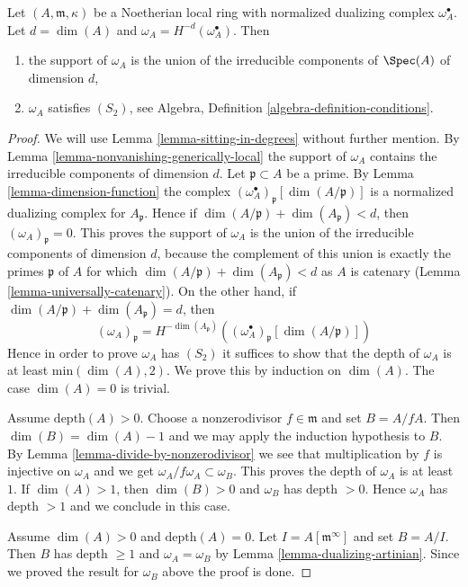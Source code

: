 \begin{lemma}
\label{lemma-depth-dualizing-module}
Let $(A, \mathfrak m, \kappa)$ be a Noetherian local ring with
normalized dualizing complex $\omega_A^\bullet$. Let $d = \dim(A)$
and $\omega_A = H^{-d}(\omega_A^\bullet)$. Then
\begin{enumerate}
\item the support of $\omega_A$ is the union of the irreducible components
of $\Spec(A)$ of dimension $d$,
\item $\omega_A$ satisfies $(S_2)$, see
Algebra, Definition \ref{algebra-definition-conditions}.
\end{enumerate}
\end{lemma}

\begin{proof}
We will use Lemma \ref{lemma-sitting-in-degrees} without further mention.
By Lemma \ref{lemma-nonvanishing-generically-local} the support
of $\omega_A$ contains the irreducible components of dimension $d$.
Let $\mathfrak p \subset A$ be a prime. By Lemma \ref{lemma-dimension-function}
the complex $(\omega_A^\bullet)_{\mathfrak p}[\dim(A/\mathfrak p)]$
is a normalized dualizing complex for $A_\mathfrak p$. Hence if
$\dim(A/\mathfrak p) + \dim(A_\mathfrak p) < d$, then
$(\omega_A)_\mathfrak p = 0$.
This proves the support of $\omega_A$ is the union of the irreducible
components of dimension $d$, because the complement of this union
is exactly the primes $\mathfrak p$ of $A$ for which
$\dim(A/\mathfrak p) + \dim(A_\mathfrak p) < d$ as $A$ is catenary
(Lemma \ref{lemma-universally-catenary}).
On the other hand, if $\dim(A/\mathfrak p) + \dim(A_\mathfrak p) = d$, then
$$
(\omega_A)_\mathfrak p =
H^{-\dim(A_\mathfrak p)}\left(
(\omega_A^\bullet)_{\mathfrak p}[\dim(A/\mathfrak p)] \right)
$$
Hence in order to prove $\omega_A$ has $(S_2)$ it suffices to show that
the depth of $\omega_A$ is at least $\text{min}(\dim(A), 2)$.
We prove this by induction on $\dim(A)$. The case $\dim(A) = 0$ is
trivial.

\medskip\noindent
Assume $\text{depth}(A) > 0$. Choose a nonzerodivisor $f \in \mathfrak m$
and set $B = A/fA$. Then $\dim(B) = \dim(A) - 1$ and we may apply the
induction hypothesis to $B$. By Lemma \ref{lemma-divide-by-nonzerodivisor}
we see that multiplication by $f$ is injective on $\omega_A$ and we get
$\omega_A/f\omega_A \subset \omega_B$. This proves the depth of $\omega_A$
is at least $1$. If $\dim(A) > 1$, then $\dim(B) > 0$ and $\omega_B$
has depth $ > 0$. Hence $\omega_A$ has depth $> 1$ and we conclude in
this case.

\medskip\noindent
Assume $\dim(A) > 0$ and $\text{depth}(A) = 0$. Let
$I = A[\mathfrak m^\infty]$ and set $B = A/I$. Then $B$ has
depth $\geq 1$ and $\omega_A = \omega_B$ by
Lemma \ref{lemma-dualizing-artinian}.
Since we proved the result for $\omega_B$ above the proof is done.
\end{proof}





